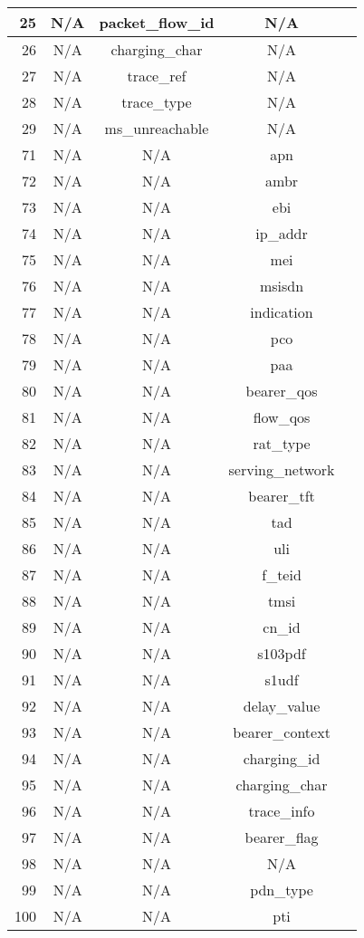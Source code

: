 \documentclass[english]{report}
\begin{document}
\begin{itemize}
\begin{longtable}{|r|c|c|c|p{13.5cm}|}
\hline
25 & N/A & packet\_flow\_id & N/A\\
\hline
26 & N/A & charging\_char & N/A\\
\hline
27 & N/A & trace\_ref & N/A\\
\hline
28 & N/A & trace\_type & N/A\\
\hline
29 & N/A & ms\_unreachable & N/A\\
\hline
71 & N/A & N/A & apn\\
\hline
72 & N/A & N/A & ambr\\
\hline
73 & N/A & N/A & ebi\\
\hline
74 & N/A & N/A & ip\_addr\\
\hline
75 & N/A & N/A & mei\\
\hline
76 & N/A & N/A & msisdn\\
\hline
77 & N/A & N/A & indication\\
\hline
78 & N/A & N/A & pco\\
\hline
79 & N/A & N/A & paa\\
\hline
80 & N/A & N/A & bearer\_qos\\
\hline
81 & N/A & N/A & flow\_qos\\
\hline
82 & N/A & N/A & rat\_type\\
\hline
83 & N/A & N/A & serving\_network\\
\hline
84 & N/A & N/A & bearer\_tft\\
\hline
85 & N/A & N/A & tad\\
\hline
86 & N/A & N/A & uli\\
\hline
87 & N/A & N/A & f\_teid\\
\hline
88 & N/A & N/A & tmsi\\
\hline
89 & N/A & N/A & cn\_id\\
\hline
90 & N/A & N/A & s103pdf\\
\hline
91 & N/A & N/A & s1udf\\
\hline
92 & N/A & N/A & delay\_value\\
\hline
93 & N/A & N/A & bearer\_context\\
\hline
94 & N/A & N/A & charging\_id\\
\hline
95 & N/A & N/A & charging\_char\\
\hline
96 & N/A & N/A & trace\_info\\
\hline
97 & N/A & N/A & bearer\_flag\\
\hline
98 & N/A & N/A & N/A\\
\hline
99 & N/A & N/A & pdn\_type\\
\hline
100 & N/A & N/A & pti\\

\end{longtable}
\end{itemize}
\end{document}
